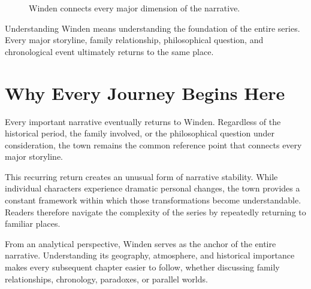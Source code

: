 \documentclass[12pt,oneside,openany]{book}
\begin{document}
\begin{figure}[H]
\centering
{}
\caption{Winden connects every major dimension of the narrative.}
\end{figure}

\begin{tcolorbox}[colback=green!6,colframe=green!50!black,title=Key Concept]
Understanding Winden means understanding the foundation of the entire series.
Every major storyline, family relationship, philosophical question, and
chronological event ultimately returns to the same place.
\end{tcolorbox}
\section{Why Every Journey Begins Here}

Every important narrative eventually returns to Winden. Regardless of the
historical period, the family involved, or the philosophical question under
consideration, the town remains the common reference point that connects every
major storyline.

This recurring return creates an unusual form of narrative stability. While
individual characters experience dramatic personal changes, the town provides a
constant framework within which those transformations become understandable.
Readers therefore navigate the complexity of the series by repeatedly returning
to familiar places.

From an analytical perspective, Winden serves as the anchor of the entire
narrative. Understanding its geography, atmosphere, and historical importance
makes every subsequent chapter easier to follow, whether discussing family
relationships, chronology, paradoxes, or parallel worlds.
\end{document}
